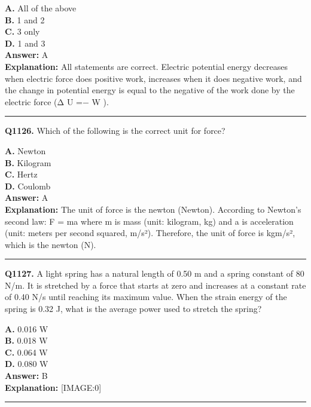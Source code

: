 \documentclass[12pt]{article}
\begin{document}
\textbf{A.} All of the above \\
\textbf{B.} 1 and 2 \\
\textbf{C.} 3 only \\
\textbf{D.} 1 and 3 \\

\textbf{Answer:} A \\
\textbf{Explanation:} All statements are correct. Electric potential energy decreases when electric force does positive work, increases when it does negative work, and the change in potential energy is equal to the negative of the work done by the electric force (Δ
U
=−
W
).

\hrule
\vspace{1em}


\noindent
\textbf{Q1126.} Which of the following is the correct unit for force?



\textbf{A.} Newton \\
\textbf{B.} Kilogram \\
\textbf{C.} Hertz \\
\textbf{D.} Coulomb \\

\textbf{Answer:} A \\
\textbf{Explanation:} The unit of force is the newton (Newton). According to Newton's second law:
F
=
ma
where
m
is mass (unit: kilogram, kg) and
a
is acceleration (unit: meters per second squared, m/s²). Therefore, the unit of force is kg\cdot m/s², which is the newton (N).

\hrule
\vspace{1em}


\noindent
\textbf{Q1127.} A light spring has a natural length of 0.50 m and a spring constant of 80 N/m. It is stretched by a force that starts at zero and increases at a constant rate of 0.40 N/s until reaching its maximum value. When the strain energy of the spring is 0.32 J, what is the average power used to stretch the spring?



\textbf{A.} 0.016 W \\
\textbf{B.} 0.018 W \\
\textbf{C.} 0.064 W \\
\textbf{D.} 0.080 W \\

\textbf{Answer:} B \\
\textbf{Explanation:} [IMAGE:0]

\hrule
\vspace{1em}
\end{document}
